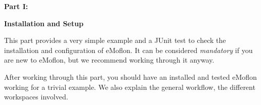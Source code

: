 {\bf \huge Part I:}
\vspace{0.7cm}
 
{\bf \Huge Installation and Setup }

\vspace{0.5cm}

This part provides a very simple example and a JUnit test to check the installation and configuration of eMoflon. It can be considered \emph{mandatory} if you
are new to eMoflon, but we recommend working through it anyway.

After working through this part, you should have an installed and tested eMoflon working for a trivial example. We also explain the general workflow, the
different workspaces involved.


\downloadLocation{\dlPartOne}






